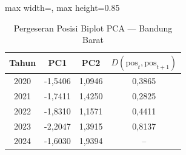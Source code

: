 \begin{table}[H]
\centering
\caption{Pergeseran Posisi Biplot PCA --- Bandung Barat} \label{tab:appjarak_pca_skor_bandung_barat}
\begin{adjustbox}{max width=\textwidth, max height=0.85\textheight}
\begin{tabular}{|c|c|c|c|}
\hline
\textbf{Tahun} & \textbf{PC1} & \textbf{PC2} & \textbf{$D(\text{pos}_t, \text{pos}_{t+1})$} \\
\hline
2020 & -1,5406 & 1,0946 & 0,3865 \\
2021 & -1,7411 & 1,4250 & 0,2825 \\
2022 & -1,8310 & 1,1571 & 0,4411 \\
2023 & -2,2047 & 1,3915 & 0,8137 \\
2024 & -1,6030 & 1,9394 & -- \\
\hline
\end{tabular}
\end{adjustbox}
\end{table}
